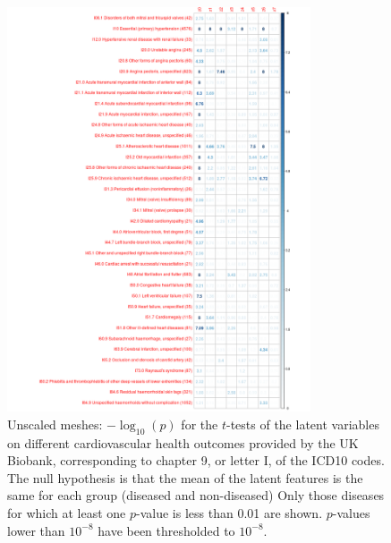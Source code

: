 \begin{figure}
\includegraphics[width=0.8\textwidth]{figs/diseases/experiment_2_health_outcome_t-test}
\caption{Unscaled meshes: $-\log_{10}(p)$ for the $t$-tests of the latent variables on different cardiovascular health outcomes provided by the UK Biobank, corresponding to chapter 9, or letter I, of the ICD10 codes. The null hypothesis is that the mean of the latent features is the same for each group (diseased and non-diseased) Only those diseases for which at least one $p$-value is less than 0.01 are shown. $p$-values lower than $10^{-8}$ have been thresholded to $10^{-8}$.}
\label{fig:health_outcomes_unscaled}
\end{figure}

